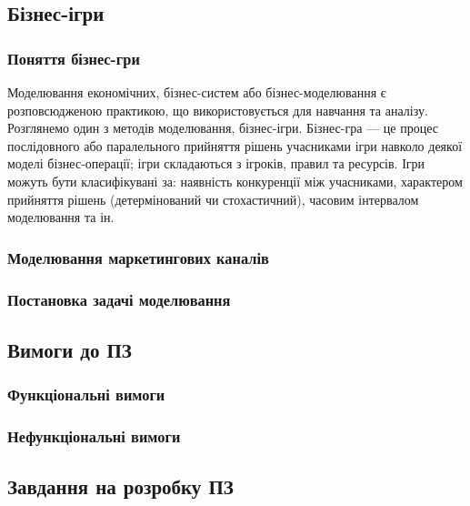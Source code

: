 \subsection{Бізнес-ігри}
\subsubsection{Поняття бізнес-гри}
Моделювання економічних, бізнес-систем або бізнес-моделювання є розповсюдженою практикою, що використовується для навчання та аналізу. Розглянемо один з методів моделювання, бізнес-ігри. Бізнес-гра --- це процес послідовного або паралельного прийняття рішень учасниками ігри навколо деякої моделі бізнес-операції\cite{}; ігри складаються з ігроків, правил та ресурсів\cite{}. Ігри можуть бути класифікувані за: наявність конкуренції між учасниками, характером прийняття рішень (детермінований чи стохастичний), часовим інтервалом моделювання та ін.
\subsubsection{Моделювання маркетингових каналів}
\subsubsection{Постановка задачі моделювання}

\subsection{Вимоги до ПЗ}
\subsubsection{Функціональні вимоги}

\subsubsection{Нефункціональні вимоги}
\subsection{Завдання на розробку ПЗ}